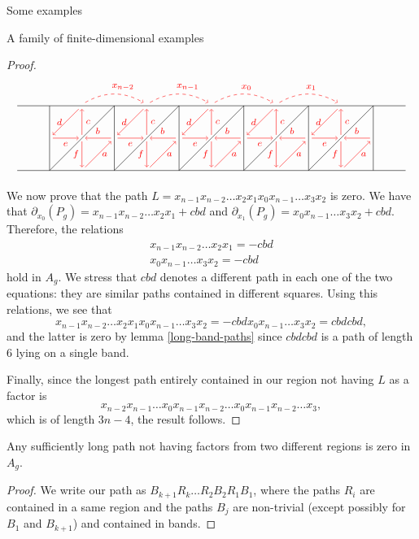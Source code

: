 \begin{chapter}{Some examples}
\begin{section}{A family of finite-dimensional examples}
\begin{proof}
\[
\begin{tikzpicture}[text width=1.5mm, font=\footnotesize]
\draw (-6, 0) -- (6, 0);
\draw (-6, 2) -- (6, 2);
\foreach \x in {-5,-3,...,5}
\draw (\x, 0) -- (\x, 2);
\foreach \x in {-5,-3,...,3}
{
\draw (\x,0) -- (\x+2, 2);
\draw [->, red] (\x+1.9, 1) to node[above] {$b$} (\x+1.1, 1);
\draw[->, red] (\x+1, 0.9) to node[left]{$f$} (\x+1, 0.1);
\draw[->, red] (\x+1.1, 0.1) to node[right]{$a$} (\x+1.9, 0.9);
\draw[->, red] (\x+1, 1.1) to node[right]{$c$} (\x+1, 1.9);
\draw[->, red] (\x+0.9, 1.9) to node[left]{$d$} (\x+0.1, 1.1);
\draw[->, red] (\x+0.1, 1) to node[below]{$e$} (\x+0.9, 1);
}

\draw[->, red, dashed] (-5+1.1, 2.1) to [bend left] node[above]{$x_{n-2}$} (-5+2.9, 2.1);
\draw[->, red, dashed] (-3+1.1, 2.1) to [bend left] node[above]{$x_{n-1}$} (-3+2.9, 2.1);
\draw[->, red, dashed] (-1+1.1, 2.1) to [bend left] node[above]{$x_{0}$} (-1+2.9, 2.1);
\draw[->, red, dashed] (1+1.1, 2.1) to [bend left] node[above]{$x_{1}$} (1+2.9, 2.1);
\end{tikzpicture}
\]

We now prove that the path $L=x_{n-1}x_{n-2}\dots x_2x_1x_{0}x_{n-1}\dots x_3x_2$ is zero. We have that $\partial_{x_0}(P_g)=x_{n-1}x_{n-2}\dots x_2x_1+cbd$ and $\partial_{x_1}(P_g)=x_{0}x_{n-1}\dots x_3x_2+cbd$. Therefore, the relations
\begin{align*}
x_{n-1}x_{n-2}\dots x_2x_1=-cbd\\
x_{0}x_{n-1}\dots x_3x_2=-cbd
\end{align*}
hold in $A_g$. We stress that $cbd$ denotes a different path in each one of the two equations: they are similar paths contained in different squares. Using this relations, we see that $$ x_{n-1}x_{n-2}\dots x_2x_1x_{0}x_{n-1}\dots x_3x_2=-cbdx_{0}x_{n-1}\dots x_3x_2=cbdcbd,$$ and the latter is zero by lemma \ref{long-band-paths} since $cbdcbd$ is a path of length 6 lying on a single band. 

Finally, since the longest path entirely contained in our region not having $L$ as a factor is
$$x_{n-2}x_{n-1}\dots x_0x_{n-1}x_{n-2}\dots x_0x_{n-1}x_{n-2}\dots x_3,$$
which is of length $3n-4$, the result follows.
\end{proof}

\begin{lemma} \label{long-br-paths} Any sufficiently long path not having factors from two different regions is zero in $A_g$.
\end{lemma}
\begin{proof} We write our path as $B_{k+1}R_k\dots R_2 B_2 R_1 B_1$, where the paths $R_i$ are contained in a same region and the paths $B_j$ are non-trivial (except possibly for $B_1$ and $B_{k+1}$) and contained in bands.


\end{proof}
\end{section}
\end{chapter}
